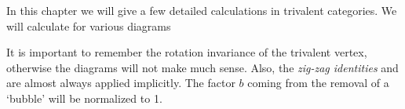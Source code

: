 In this chapter we will give a few detailed calculations in trivalent categories. We will calculate for various diagrams

It is important to remember the rotation invariance of the trivalent vertex, otherwise the diagrams will not make much sense. Also, the \emph{zig-zag identities}
and
are almost always applied implicitly. The factor $b$ coming from the removal of a `bubble' will be normalized to 1.

